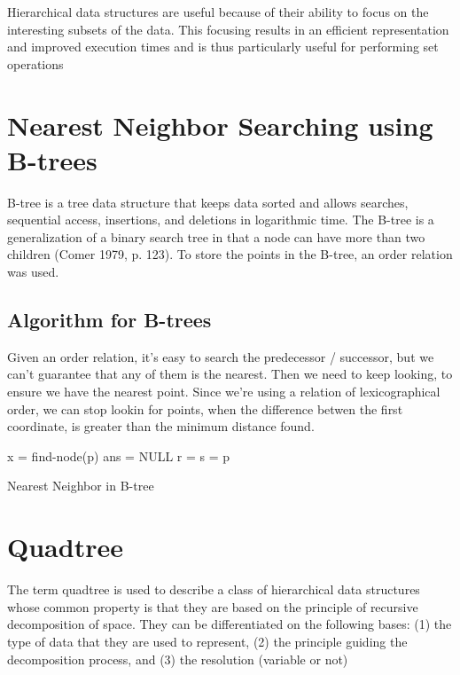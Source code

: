 \documentclass[ijoc,nonblindrev]{informs3} %
\begin{document}
Hierarchical data structures are useful because of their ability to focus on the
interesting subsets of the data. 
This focusing results in an efficient representation and improved execution times and is thus
particularly useful for performing set operations

\section{Nearest Neighbor Searching using B-trees}
B-tree is a tree data structure that keeps data sorted
and allows searches, sequential access, insertions, 
and deletions in logarithmic time. 
The B-tree is a generalization of a binary search tree 
in that a node can have more than two children (Comer 1979, p. 123).
To store the points in the B-tree, an order relation was used.

\subsection{Algorithm for B-trees}
Given an order relation, it's easy to search the predecessor / successor,
but we can't guarantee that any of them is the nearest.
Then we need to keep looking, to ensure we have the nearest point.
Since we're using a relation of lexicographical order,
we can stop lookin for points, 
when the difference betwen the first coordinate,
is greater than the minimum distance found.

\begin{algorithm}[t]
  x = find-node(p)\;
  ans = NULL\;
  r = s = p\;
  \caption{Nearest Neighbor in B-tree}
\end{algorithm}

\section{Quadtree}
The term quadtree is used to describe a class of hierarchical data structures whose
common property is that they are based on the principle of recursive decomposition of space.
They can be differentiated on the following bases: 
(1) the type of data that they are used to represent, 
(2) the principle guiding the decomposition process, and 
(3) the resolution (variable or not)
\end{document}
